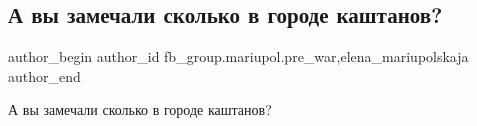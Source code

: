  
 
 
 
 

\subsection{А вы замечали сколько в городе каштанов?}
\label{sec:11_02_2023.fb.fb_group.mariupol.pre_war.7.a_vi_zamechali_skolk}
 
\ifcmt
 author_begin
   author_id fb_group.mariupol.pre_war,elena_mariupolskaja
 author_end
\fi

А вы замечали сколько в городе каштанов?

